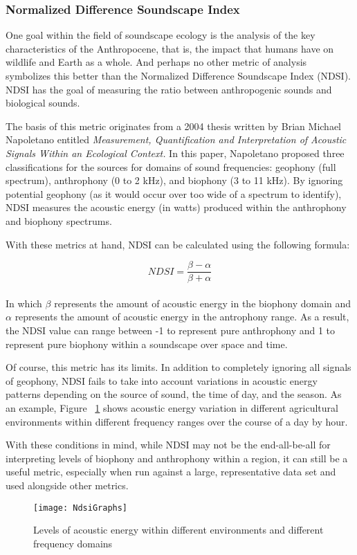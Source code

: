 \subsubsection{Normalized Difference Soundscape Index}
One goal within the field of soundscape ecology is the analysis of the key characteristics of the Anthropocene, that is, the impact that humans have on wildlife and Earth as a whole. And perhaps no other metric of analysis symbolizes this better than the Normalized Difference Soundscape Index (NDSI). NDSI has the goal of measuring the ratio between anthropogenic sounds and biological sounds.\par
The basis of this metric originates from a 2004 thesis written by Brian Michael Napoletano entitled \textit{Measurement, Quantification and Interpretation of Acoustic Signals Within an Ecological Context.} In this paper, Napoletano proposed three classifications for the sources for domains of sound frequencies: geophony (full spectrum), anthrophony (0 to 2 kHz), and biophony (3 to 11 kHz).\cite{napoletano} By ignoring potential geophony (as it would occur over too wide of a spectrum to identify), NDSI measures the acoustic energy (in watts) produced within the anthrophony and biophony spectrums.\par
With these metrics at hand, NDSI can be calculated using the following formula:\par

\begin{equation}
  NDSI = \frac{\beta - \alpha}{\beta + \alpha}
\end{equation} \\[\eqnspace]

In which \(\beta\) represents the amount of acoustic energy in the biophony domain and \(\alpha\) represents the amount of acoustic energy in the antrophony range. As a result, the NDSI value can range between -1 to represent pure anthrophony and 1 to represent pure biophony within a soundscape over space and time.\cite{gage}\par
Of course, this metric has its limits. In addition to completely ignoring all signals of geophony, NDSI fails to take into account variations in acoustic energy patterns depending on the source of sound, the time of day, and the season. As an example, Figure ~\ref{fig:ndsiGraphs} shows acoustic energy variation in different agricultural environments within different frequency ranges over the course of a day by hour.\par
With these conditions in mind, while NDSI may not be the end-all-be-all for interpreting levels of biophony and anthrophony within a region, it can still be a useful metric, especially when run against a large, representative data set and used alongside other metrics.\par

\begin{figure}
  \begin{center}
    \texttt{[image: NdsiGraphs]}
  \end{center}
  \caption{Levels of acoustic energy within different environments and different frequency domains}
  \label{fig:ndsiGraphs}
\end{figure}
